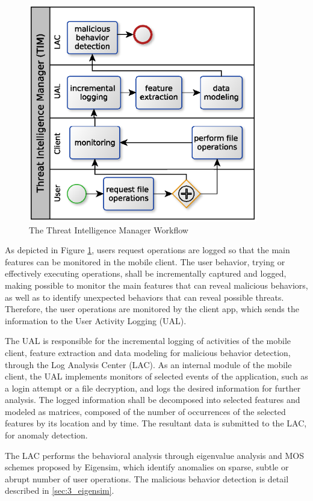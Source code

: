 \begin{figure}[h!]
	\centering
	\includegraphics[width=10cm]{figures/ch3/fig06.eps}
	\caption{The Threat Intelligence Manager Workflow}
	\label{fig:3_06}
\end{figure}

As depicted in Figure \ref{fig:3_06}, users request operations are logged so that the main features can be monitored in the mobile client. The user behavior, trying or effectively executing operations, shall be incrementally captured and logged, making possible to monitor the main features that can reveal malicious behaviors, as well as to identify unexpected behaviors that can reveal possible threats. Therefore, the user operations are monitored by the client app, which sends the information to the User Activity Logging (UAL). 

The UAL is responsible for the incremental logging of activities of the mobile client, feature extraction and data modeling for malicious behavior detection, through the Log Analysis Center (LAC). As an internal module of the mobile client, the UAL implements monitors of selected events of the application, such as a login attempt or a file decryption, and logs the desired information for further analysis. The logged information shall be decomposed into selected features and modeled as matrices, composed of the number of occurrences of the selected features by its location and by time. The resultant data is submitted to the LAC, for anomaly detection.

The LAC performs the behavioral analysis through eigenvalue analysis and MOS schemes proposed by Eigensim, which identify anomalies on sparse, subtle or abrupt number of user operations. The malicious behavior detection is detail described in \ref{sec:3_eigensim}.

